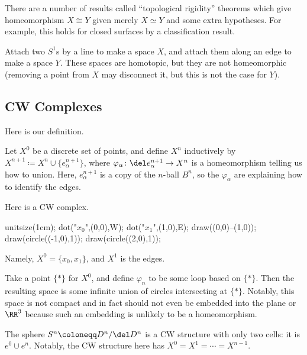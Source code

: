 \documentclass[../notes.tex]{subfiles}
\begin{document}
\begin{remark}
	There are a number of results called ``topological rigidity'' theorems which give homeomorphism $X\cong Y$ given merely $X\simeq Y$ and some extra hypotheses. For example, this holds for closed surfaces by a classification result.
\end{remark}
\begin{example}
	Attach two $S^1$s by a line to make a space $X$, and attach them along an edge to make a space $Y$. These spaces are homotopic, but they are not homeomorphic (removing a point from $X$ may disconnect it, but this is not the case for $Y$).
\end{example}

\subsection{CW Complexes}
Here is our definition.
\begin{definition}[CW complex]
	Let $X^0$ be a discrete set of points, and define $X^n$ inductively by $X^{n+1}\coloneqq X^n\cup\{e_\alpha^{n+1}\}$, where $\varphi_\alpha\colon\del e_\alpha^{n+1}\to X^n$ is a homeomorphism telling us how to union. Here, $e_\alpha^{n+1}$ is a copy of the $n$-ball $B^n$, so the $\varphi_\alpha$ are explaining how to identify the edges.
\end{definition}
\begin{example}
	Here is a CW complex.
	\begin{center}
		\begin{asy}
			unitsize(1cm);
			dot("$x_0$",(0,0),W);
			dot("$x_1$",(1,0),E);
			draw((0,0)--(1,0));
			draw(circle((-1,0),1));
			draw(circle((2,0),1));
		\end{asy}
	\end{center}
	Namely, $X^0=\{x_0,x_1\}$, and $X^1$ is the edges.
\end{example}
\begin{example}
	Take a point $\{*\}$ for $X^0$, and define $\varphi_n$ to be some loop based on $\{*\}$. Then the resulting space is some infinite union of circles intersecting at $\{*\}$. Notably, this space is not compact and in fact should not even be embedded into the plane or $\RR^3$ because such an embedding is unlikely to be a homeomorphism.
\end{example}
\begin{example}
	The sphere $S^n\coloneqq D^n/\del D^n$ is a CW structure with only two cells: it is $e^0\cup e^n$. Notably, the CW structure here has $X^0=X^1=\cdots=X^{n-1}$.
\end{example}
\end{document}
